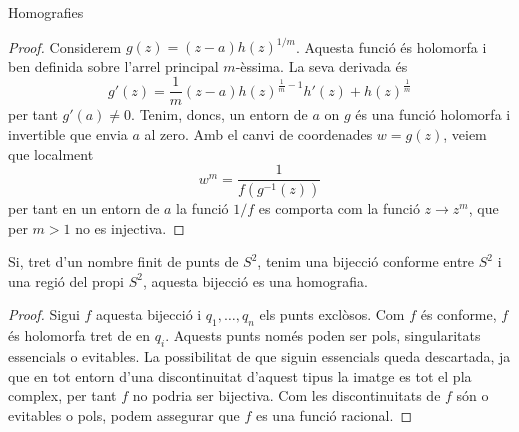 \documentclass[dvipsnames, svgnames, leqno, a4paper, 12pt]{report}
\begin{document}
\begin{chapter}{Homografies}
\begin{proof}
            Considerem \begin{math}
                g(z)=(z-a)h(z)^{1/m}
            \end{math}. Aquesta funció és holomorfa i ben definida sobre l'arrel principal $m$-èssima. La seva derivada és 
            \begin{displaymath}
                g'(z)=\frac{1}{m}(z-a)h(z)^{\frac{1}{m}-1}h'(z)+h(z)^{\frac{1}{m}}
            \end{displaymath} per tant $g'(a)\neq0$.
            Tenim, doncs, un entorn de $a$ on $g$ és una funció holomorfa i invertible que envia $a$ al zero. Amb el canvi de coordenades $ w  = g(z)$, veiem que localment \begin{displaymath}
                 w ^m = \frac{1}{f(g^{-1}(z))}
            \end{displaymath} per tant en un entorn de $a$ la funció $1/f$ es comporta com la funció $z\to z^m$, que per $m>1$ no es injectiva.
        \end{proof}
        \begin{theorem}
            Si, tret d'un nombre finit de punts de $S^2$, tenim una bijecció conforme entre $S^2$ i una regió del propi $S^2$, aquesta bijecció es una homografia.
        \end{theorem}
        \begin{proof}
            Sigui $f$ aquesta bijecció i $q_1,\dots,q_n$ els punts exclòsos. Com $f$ és conforme, $f$ és holomorfa tret de en $q_i$. Aquests punts només poden ser pols, singularitats essencials o evitables. La possibilitat de que siguin essencials queda descartada, ja que en tot entorn d'una discontinuitat d'aquest tipus la imatge es tot el pla complex, per tant $f$ no podria ser bijectiva. Com les discontinuitats de $f$ són o evitables o pols, podem assegurar que $f$ es una funció racional. 
            

\end{proof}
\end{chapter}
\end{document}
